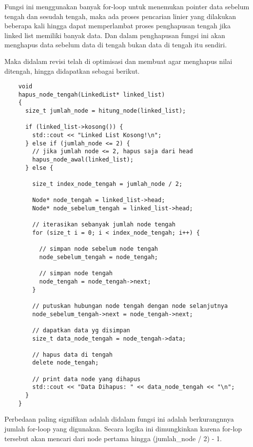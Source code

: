 \documentclass[12pt, a4paper]{article}
\begin{document}
  Fungsi ini menggunakan banyak for-loop untuk menemukan pointer data sebelum
  tengah dan sesudah tengah, maka ada proses pencarian linier yang dilakukan
  beberapa kali hingga dapat memperlambat proses penghapusan tengah jika linked
  list memiliki banyak data. Dan dalam penghapusan fungsi ini akan menghapus
  data sebelum data di tengah bukan data di tengah itu sendiri.

  Maka didalam revisi telah di optimisasi dan membuat agar menghapus nilai
  ditengah, hingga didapatkan sebagai berikut.

  \vspace{0.5cm}
  \begin{lstlisting}
    void
    hapus_node_tengah(LinkedList* linked_list)
    {
      size_t jumlah_node = hitung_node(linked_list);

      if (linked_list->kosong()) {
        std::cout << "Linked List Kosong!\n";
      } else if (jumlah_node <= 2) {
        // jika jumlah node <= 2, hapus saja dari head
        hapus_node_awal(linked_list);
      } else {

        size_t index_node_tengah = jumlah_node / 2;

        Node* node_tengah = linked_list->head;
        Node* node_sebelum_tengah = linked_list->head;

        // iterasikan sebanyak jumlah node tengah
        for (size_t i = 0; i < index_node_tengah; i++) {

          // simpan node sebelum node tengah
          node_sebelum_tengah = node_tengah;

          // simpan node tengah
          node_tengah = node_tengah->next;
        }

        // putuskan hubungan node tengah dengan node selanjutnya
        node_sebelum_tengah->next = node_tengah->next;

        // dapatkan data yg disimpan
        size_t data_node_tengah = node_tengah->data;

        // hapus data di tengah
        delete node_tengah;

        // print data node yang dihapus
        std::cout << "Data Dihapus: " << data_node_tengah << "\n";
      }
    }
  \end{lstlisting}
  \vspace{0.5cm}

  Perbedaan paling signifikan adalah didalam fungsi ini adalah berkurangnnya
  jumlah for-loop yang digunakan. Secara logika ini dimungkinkan karena
  for-lop tersebut akan mencari dari node pertama hingga (jumlah\_node / 2) - 1.
\end{document}
